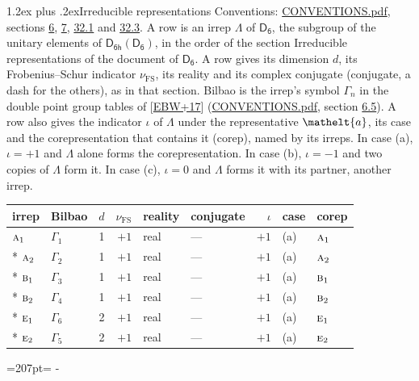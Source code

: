 \documentclass[10pt,a4paper]{article}
\makeatletter
\renewcommand\section{\@startsection{section}{1}{\z@}{-3ex plus -1ex minus -.2ex}%
  {1.2ex plus .2ex}{\normalfont\large\sffamily\bfseries\color{parttitle}}}
\newcommand{\needspace}[1]{\par\penalty-100\begingroup\dimen0=#1\relax\dimen2=\pagegoal
  \advance\dimen2-\pagetotal\ifdim\dimen0>\dimen2\relax\ifdim\dimen2>0pt\vfil\break\fi\fi
  \endgroup}
\numberwithin{equation}{section}
\newcommand{\eltfont}[1]{{\let\sigma\eltsigma\mathelt{#1}}}
\newcommand{\grp}[1]{\mathsf{#1}}
\newcommand{\irr}[1]{\text{\normalfont\scshape #1}}
\newcommand{\elt}[1]{\eltfont{#1}}
\newcommand{\fsind}{\nu_{\mathrm{FS}}}
\makeatother
\begin{document}
\section{Irreducible representations}\label{s:irreps}
Conventions: \href{../../CONVENTIONS.pdf}{CONVENTIONS.pdf}, sections \href{../../../rotation/CONVENTIONS.pdf\#conv.6}{6}, \href{../../../rotation/CONVENTIONS.pdf\#conv.7}{7}, \href{../../CONVENTIONS.pdf\#conv.32.1}{32.1} and \href{../../CONVENTIONS.pdf\#conv.32.3}{32.3}.
\leavevmode\label{n:irrep.Delta}A row is an irrep $\Lambda$ of $\grp{D_{6}}$, the subgroup of the unitary elements of $\grp{D_{6h}}(\grp{D_{6}})$, in the order of the section Irreducible representations of the document of \href{../../../rotation/data/pdf/D6.pdf}{$\grp{D_{6}}$}. \label{n:index.dimension}\label{n:index.frobenius}\label{n:head.irrep}\label{n:head.reality}\label{n:head.conjugate}A row gives its dimension $d$, its Frobenius--Schur indicator $\fsind$, its reality and its complex conjugate (conjugate, a dash for the others), as in that section. \label{n:head.bilbao}\label{n:irrep.alias.gamma}Bilbao is the irrep's symbol $\Gamma_n$ in the double point group tables of [\href{../../../REFERENCES.pdf\#ref.EBW+17}{EBW+17}] (\href{../../CONVENTIONS.pdf}{CONVENTIONS.pdf}, section \href{../../../rotation/CONVENTIONS.pdf\#conv.6.5}{6.5}). \label{n:head.case.corep}\label{n:head.corep}A row also gives the indicator $\iota$ of $\Lambda$ under the representative $\elt{a}$, its case and the corepresentation that contains it (corep), named by its irreps. In case (a), $\iota = +1$ and $\Lambda$ alone forms the corepresentation. In case (b), $\iota = -1$ and two copies of $\Lambda$ form it. In case (c), $\iota = 0$ and $\Lambda$ forms it with its partner, another irrep.
\setlength{\emergencystretch}{2em}\par\setlength{\emergencystretch}{0pt}
{\small\renewcommand{\arraystretch}{1.25}\setlength{\tabcolsep}{4pt}\begin{longtable}{@{}llrrllrll@{}}\toprule
irrep & Bilbao & $d$ & $\fsind$ & reality & conjugate & $\iota$ & case & corep\\\midrule\endhead
\bottomrule\endfoot\endlastfoot
$\irr{a}_{1}$ & $\Gamma_{1}$ & 1 & $+1$ & real & --- & $+1$ & (a) & $\irr{a}_{1}$\\*
$\irr{a}_{2}$ & $\Gamma_{2}$ & 1 & $+1$ & real & --- & $+1$ & (a) & $\irr{a}_{2}$\\*
$\irr{b}_{1}$ & $\Gamma_{3}$ & 1 & $+1$ & real & --- & $+1$ & (a) & $\irr{b}_{1}$\\*
$\irr{b}_{2}$ & $\Gamma_{4}$ & 1 & $+1$ & real & --- & $+1$ & (a) & $\irr{b}_{2}$\\*
$\irr{e}_{1}$ & $\Gamma_{6}$ & 2 & $+1$ & real & --- & $+1$ & (a) & $\irr{e}_{1}$\\*
$\irr{e}_{2}$ & $\Gamma_{5}$ & 2 & $+1$ & real & --- & $+1$ & (a) & $\irr{e}_{2}$\\
\bottomrule\end{longtable}}
\needspace{207pt}
\end{document}
